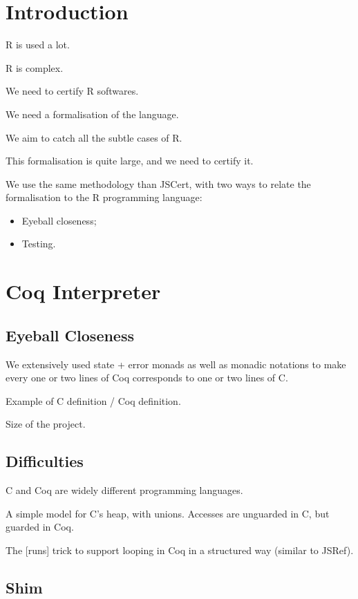 \documentclass[10pt, acmart]{article}
\begin{document}
\section{Introduction}
\label{sec:intro}

R is used a lot.

R is complex.

We need to certify R softwares.

We need a formalisation of the language.

We aim to catch all the subtle cases of R.

This formalisation is quite large, and we need to certify it.

We use the same methodology than JSCert, with two ways to relate the formalisation to the R programming language:
\begin{itemize}
	\item Eyeball closeness;
	\item Testing.
\end{itemize}

\section{Coq Interpreter}

\subsection{Eyeball Closeness}
\label{sec:eyeball:closeness}

We extensively used state + error monads as well as monadic notations
to make every one or two lines of Coq corresponds to one or two lines of C.

Example of C definition / Coq definition.

Size of the project.

\subsection{Difficulties}
\label{sec:coq:difficulties}

C and Coq are widely different programming languages.

A simple model for C’s heap, with unions.
Accesses are unguarded in C, but guarded in Coq.

The [runs] trick to support looping in Coq in a structured way (similar to JSRef).

\subsection{Shim}
\label{sec:shim}
\end{document}
